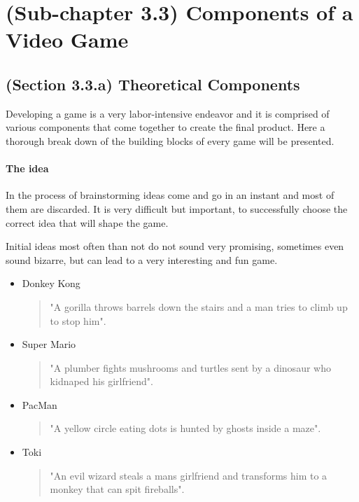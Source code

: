 \documentclass[a4paper,one side,12pt]{book}
\begin{document}
\section{(Sub-chapter 3.3) Components of a Video
Game}

\subsection{(Section 3.3.a) Theoretical Components}

Developing a game is a very labor-intensive endeavor and it is
comprised of various components that come together to create the final
product. Here a thorough break down of the building blocks of every game
will be presented.


\paragraph{The idea\\}

In the process of brainstorming ideas come and go in an instant and most
of them are discarded. It is very difficult but important, to
successfully choose the correct idea that will shape the game.

Initial ideas most often than not do not sound very
promising, sometimes even sound bizarre, but can lead to a very
interesting and fun game.

\begin{itemize}
\item
  Donkey Kong
  
  \begin{quote}
"A gorilla throws barrels down the stairs and a man tries to climb up
to stop him".
\end{quote}

\item
  Super Mario 
  \begin{quote}
    "A plumber fights mushrooms and turtles sent by a
    dinosaur who kidnaped his girlfriend".
  \end{quote}
 
\item
  PacMan

\begin{quote}
"A yellow circle eating dots is hunted by ghosts inside a maze".
\end{quote}

\item
  Toki

\begin{quote}
"An evil wizard steals a man\textquotesingle s girlfriend and
transforms him to a monkey that can spit fireballs".
\end{quote}
\end{itemize}
\end{document}
